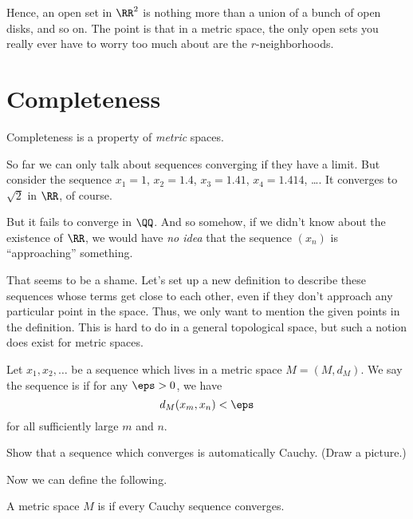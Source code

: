 Hence, an open set in $\RR^2$ is nothing more than a union
of a bunch of open disks, and so on.
The point is that in a metric space, the only open sets you really
ever have to worry too much about are the $r$-neighborhoods.


\section{Completeness}
Completeness is a property of \emph{metric} spaces.

So far we can only talk about sequences converging if they have a limit.
But consider the sequence $x_1 = 1$, $x_2 = 1.4$, $x_3 = 1.41$, $x_4 = 1.414$, \dots.
It converges to $\sqrt 2$ in $\RR$, of course.

But it fails to converge in $\QQ$.
And so somehow, if we didn't know about the existence of $\RR$, we would
have \emph{no idea} that the sequence $(x_n)$ is ``approaching'' something.

That seems to be a shame.
Let's set up a new definition to describe these sequences whose terms
get close to each other,
even if they don't approach any particular point in the space.
Thus, we only want to mention the given points in the definition.
This is hard to do in a general topological space,
but such a notion does exist for metric spaces.

\begin{definition}
	Let $x_1, x_2, \dots$ be a sequence which lives in a metric space $M = (M,d_M)$.
	We say the sequence is  if for any $\eps > 0$, we have
	\[ d_M(x_m, x_n) < \eps \]
	for all sufficiently large $m$ and $n$.
\end{definition}

\begin{ques}
	Show that a sequence which converges is automatically Cauchy.
	(Draw a picture.)
\end{ques}

Now we can define the following.
\begin{definition}
	A metric space $M$ is  if every
	Cauchy sequence converges.
\end{definition}

